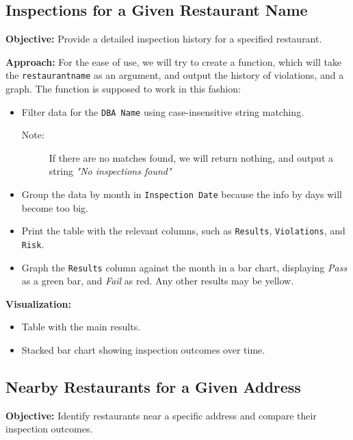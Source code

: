 \documentclass[12pt]{article}
\begin{document}
\subsection*{Inspections for a Given Restaurant Name}
\textbf{Objective:} Provide a detailed inspection history for a specified restaurant.

\textbf{Approach:}
For the ease of use, we will try to create a function, which will take the \texttt{restaurant\underline{\space}name} as an argument,
and output the history of violations, and a graph.
The function is supposed to work in this fashion:
\begin{itemize}
    \item Filter data for the \texttt{DBA Name} using case-insensitive string matching.
    \begin{description}
        \item[Note:] If there are no matches found, we will return nothing, and output a string \textit{"No inspections found"}
    \end{description}
    \item Group the data by month in \texttt{Inspection Date} because the info by days will become too big.
    \item Print the table with the relevant columns, such as \texttt{Results}, \texttt{Violations}, and \texttt{Risk}.
    \item Graph the \texttt{Results} column against the month in a bar chart, displaying \textit{Pass} as a green bar, and \textit{Fail} as red.
    Any other results may be yellow.
\end{itemize}

\textbf{Visualization:}
\begin{itemize}
    \item Table with the main results.
    \item Stacked bar chart showing inspection outcomes over time.
\end{itemize}

\subsection*{Nearby Restaurants for a Given Address}
\textbf{Objective:} Identify restaurants near a specific address and compare their inspection outcomes.
\end{document}
